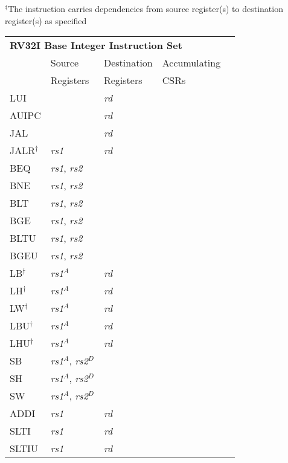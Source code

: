$^\ddagger$The instruction carries dependencies from source register(s) to destination register(s) as specified

\begin{tabular}{p{3cm}|p{3cm}|p{2cm}|p{4cm}|p{4cm}}
  \multicolumn{4}{l}{\bf RV32I Base Integer Instruction Set} \\
  \cline{2-4}
   & Source    & Destination & Accumulating \\
   & Registers & Registers   & CSRs \\
  \cline{2-4}
   LUI &  & {\em rd} &   & \\
   \cline{2-4}
   AUIPC &  & {\em rd} &   & \\
   \cline{2-4}
   JAL &  & {\em rd} &  & \\
   \cline{2-4}
   JALR$^\dagger$ & {\em rs1} & {\em rd} &  & \\
   \cline{2-4}
   BEQ & {\em rs1}, {\em rs2} &  &   & \\
   \cline{2-4}
   BNE & {\em rs1}, {\em rs2} &  &   & \\
   \cline{2-4}
   BLT & {\em rs1}, {\em rs2} &  &   & \\
   \cline{2-4}
   BGE & {\em rs1}, {\em rs2} &  &   & \\
   \cline{2-4}
   BLTU & {\em rs1}, {\em rs2} &  &   & \\
   \cline{2-4}
   BGEU & {\em rs1}, {\em rs2} &  &   & \\
   \cline{2-4}
   LB$^\dagger$ & {\em rs1}$^A$ & {\em rd} &   & \\
   \cline{2-4}
   LH$^\dagger$ & {\em rs1}$^A$ & {\em rd} &   & \\
   \cline{2-4}
   LW$^\dagger$ & {\em rs1}$^A$ & {\em rd} &   & \\
   \cline{2-4}
   LBU$^\dagger$ & {\em rs1}$^A$ & {\em rd} &   & \\
   \cline{2-4}
   LHU$^\dagger$ & {\em rs1}$^A$ & {\em rd} &   & \\
   \cline{2-4}
   SB & {\em rs1}$^A$, {\em rs2}$^D$ &  &   & \\
   \cline{2-4}
   SH & {\em rs1}$^A$, {\em rs2}$^D$ &  &   & \\
   \cline{2-4}
   SW & {\em rs1}$^A$, {\em rs2}$^D$ &  &   & \\
   \cline{2-4}
   ADDI & {\em rs1} & {\em rd} &   & \\
   \cline{2-4}
   SLTI & {\em rs1} & {\em rd} &   & \\
   \cline{2-4}
   SLTIU & {\em rs1} & {\em rd} &   & \\

\end{tabular}
